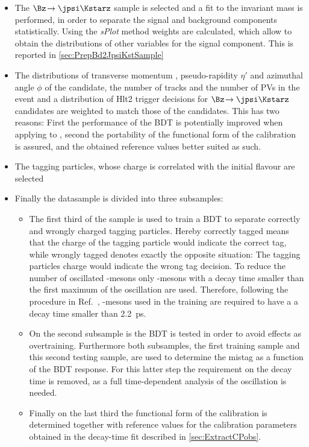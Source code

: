 \begin{itemize}
	\item The $\Bz\!\to\jpsi\Kstarz$ sample is selected and a fit to the invariant mass is performed, in order to separate the signal and background components statistically.
	Using the \emph{sPlot} method weights are calculated, which allow to obtain the distributions of other variables for the signal component. This is reported in \cref{sec:PrepBd2JpsiKstSample}
	\item The distributions of transverse momentum \pt, pseudo-rapidity $\eta'$ and azimuthal angle $\phi$ of the \Bz candidate, the number of tracks and the number of \ac{PV}s in the event and a distribution of Hlt2 trigger decisions for $\Bz\!\to\jpsi\Kstarz$ candidates are weighted to match those of the \BdToDpi candidates.
	This has two reasons: First the performance of the BDT is potentially improved when applying to \BdToDpi, second the portability of the functional form of the calibration is assured, and the obtained reference values better suited as such.
	\item The tagging particles, whose charge is correlated with the initial \B flavour are selected
	\item Finally the datasample is divided into three subsamples:
	\begin{itemize}
		\item The first third of the sample is used to train a BDT to separate correctly and wrongly charged tagging particles.
		Hereby correctly tagged means that the charge of the tagging particle would indicate the correct tag, while wrongly tagged denotes exactly the opposite situation: The tagging particles charge would indicate the wrong tag decision.
		To reduce the number of oscillated \Bz-mesons only \Bz-mesons with a decay time smaller than the first maximum of the oscillation are used.
		Therefore, following the procedure in Ref.~\cite{Aaij:2016rdg}, \Bz-mesons used in the training are required to have a a decay time smaller than \SI{2.2}{\pico\second}.
		\item On the second subsample is the BDT is tested in order to avoid effects as overtraining.
		Furthermore both subsamples, the first training sample and this second testing sample, are used to determine the mistag as a function of the BDT response. For this latter step the requirement on the \Bz decay time is removed, as a full time-dependent analysis of the \Bz oscillation is needed.
		\item Finally on the last third the functional form of the calibration is determined together with reference values for the calibration parameters obtained in the decay-time fit described in \cref{sec:ExtractCPobs}.
	\end{itemize}
\end{itemize}

